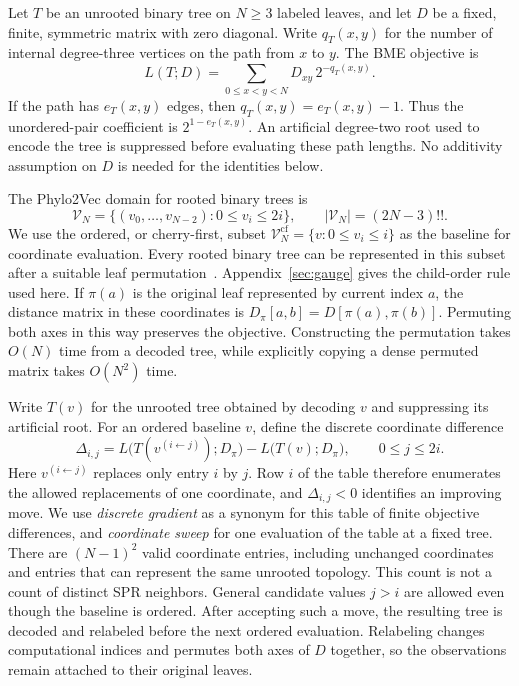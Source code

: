 \documentclass[11pt,a4paper]{article}
\makeatletter
\DeclareRobustCommand{\_}{\ifmmode\nfss@text{\textunderscore}\else\textunderscore\allowbreak\fi}
\theoremstyle{definition}
\makeatother
\begin{document}
Let $T$ be an unrooted binary tree on $N\geq3$ labeled leaves, and let $D$ be a fixed, finite, symmetric matrix with zero diagonal.
Write $q_T(x,y)$ for the number of internal degree-three vertices on the path from $x$ to $y$.
The BME objective is
\begin{equation}
 L(T;D)=\sum_{0\leq x<y<N}D_{xy}\,2^{-q_T(x,y)}.
 \label{eq:pauplin}
\end{equation}
If the path has $e_T(x,y)$ edges, then $q_T(x,y)=e_T(x,y)-1$.
Thus the unordered-pair coefficient is $2^{1-e_T(x,y)}$.
An artificial degree-two root used to encode the tree is suppressed before evaluating these path lengths.
No additivity assumption on $D$ is needed for the identities below.

The Phylo2Vec domain for rooted binary trees is
\begin{equation}
 \mathcal V_N=\{(v_0,\ldots,v_{N-2}):0\leq v_i\leq2i\},
 \qquad |\mathcal V_N|=(2N-3)!!.
 \label{eq:phylo2vec_space}
\end{equation}
We use the ordered, or cherry-first, subset
$\mathcal V_N^{\mathrm{cf}}=\{v:0\leq v_i\leq i\}$ as the baseline for coordinate evaluation.
Every rooted binary tree can be represented in this subset after a suitable leaf permutation~\cite[Lemmas~0.9--0.11]{penn2023gradme}.
Appendix~\ref{sec:gauge} gives the child-order rule used here.
If $\pi(a)$ is the original leaf represented by current index $a$, the distance matrix in these coordinates is
$D_\pi[a,b]=D[\pi(a),\pi(b)]$.
Permuting both axes in this way preserves the objective.
Constructing the permutation takes $O(N)$ time from a decoded tree, while explicitly copying a dense permuted matrix takes $O(N^2)$ time.

Write $T(v)$ for the unrooted tree obtained by decoding $v$ and suppressing its artificial root.
For an ordered baseline $v$, define the discrete coordinate difference
\begin{equation}
 \Delta_{i,j}
 =L\bigl(T(v^{(i\leftarrow j)});D_\pi\bigr)
  -L\bigl(T(v);D_\pi\bigr),\qquad 0\leq j\leq2i.
 \label{eq:discrete_gradient}
\end{equation}
Here $v^{(i\leftarrow j)}$ replaces only entry $i$ by $j$.
Row $i$ of the table therefore enumerates the allowed replacements of one coordinate, and $\Delta_{i,j}<0$ identifies an improving move.
We use \emph{discrete gradient} as a synonym for this table of finite objective differences, and \emph{coordinate sweep} for one evaluation of the table at a fixed tree.
There are $(N-1)^2$ valid coordinate entries, including unchanged coordinates and entries that can represent the same unrooted topology.
This count is not a count of distinct SPR neighbors.
General candidate values $j>i$ are allowed even though the baseline is ordered.
After accepting such a move, the resulting tree is decoded and relabeled before the next ordered evaluation.
Relabeling changes computational indices and permutes both axes of $D$ together, so the observations remain attached to their original leaves.
\end{document}
